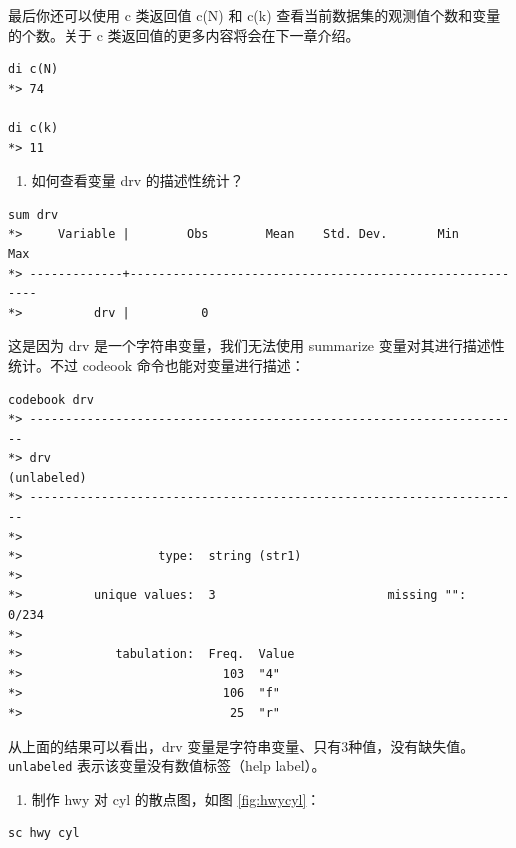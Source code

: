 \documentclass[]{ctexbook}
\providecommand{\tightlist}{%
  \setlength{\itemsep}{0pt}\setlength{\parskip}{0pt}}
\begin{document}
最后你还可以使用 c 类返回值 c(N) 和 c(k) 查看当前数据集的观测值个数和变量的个数。关于 c 类返回值的更多内容将会在下一章介绍。

\begin{lstlisting}
di c(N)
*> 74

di c(k)
*> 11
\end{lstlisting}

\begin{enumerate}
\def\labelenumi{\arabic{enumi}.}
\setcounter{enumi}{2}
\tightlist
\item
  如何查看变量 drv 的描述性统计？
\end{enumerate}

\begin{lstlisting}
sum drv
*>     Variable |        Obs        Mean    Std. Dev.       Min        Max
*> -------------+---------------------------------------------------------
*>          drv |          0
\end{lstlisting}

这是因为 drv 是一个字符串变量，我们无法使用 summarize 变量对其进行描述性统计。不过 codeook 命令也能对变量进行描述：

\begin{lstlisting}
codebook drv
*> ---------------------------------------------------------------------
*> drv                                                       (unlabeled)
*> ---------------------------------------------------------------------
*> 
*>                   type:  string (str1)
*> 
*>          unique values:  3                        missing "":  0/234
*> 
*>             tabulation:  Freq.  Value
*>                            103  "4"
*>                            106  "f"
*>                             25  "r"
\end{lstlisting}

从上面的结果可以看出，drv 变量是字符串变量、只有3种值，没有缺失值。\texttt{unlabeled} 表示该变量没有数值标签（help label）。

\begin{enumerate}
\def\labelenumi{\arabic{enumi}.}
\setcounter{enumi}{3}
\tightlist
\item
  制作 hwy 对 cyl 的散点图，如图 \ref{fig:hwycyl}：
\end{enumerate}

\begin{lstlisting}
sc hwy cyl
\end{lstlisting}
\end{document}
